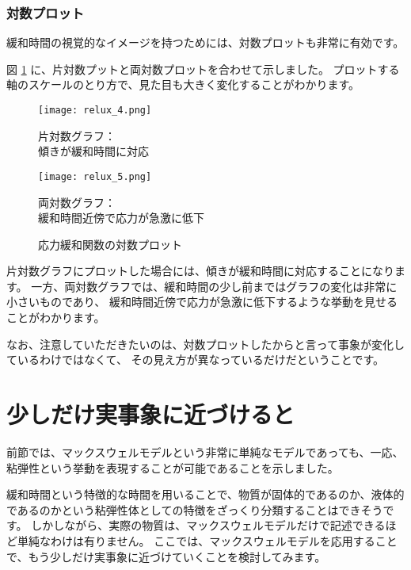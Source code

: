 \documentclass[uplatex,dvipdfmx,a4paper,11pt]{jsreport}
\begin{document}
\subsubsection{対数プロット}
緩和時間の視覚的なイメージを持つためには、対数プロットも非常に有効です。

図 \ref{fig:log_plot_relux} に、片対数プットと両対数プロットを合わせて示しました。
プロットする軸のスケールのとり方で、見た目も大きく変化することがわかります。
\begin{figure}[htb]
	\begin{center}
		\begin{minipage}{0.45\textwidth}
			\begin{center}
				\texttt{[image: relux\_4.png]}

				片対数グラフ：\\傾きが緩和時間に対応
			\end{center}
		\end{minipage}
		\begin{minipage}{0.45\textwidth}
			\begin{center}
				\texttt{[image: relux\_5.png]}

				両対数グラフ：\\緩和時間近傍で応力が急激に低下
			\end{center}
		\end{minipage}
		\caption{応力緩和関数の対数プロット}
		\label{fig:log_plot_relux}
	\end{center}
\end{figure}

片対数グラフにプロットした場合には、傾きが緩和時間に対応することになります。
一方、両対数グラフでは、緩和時間の少し前まではグラフの変化は非常に小さいものであり、
緩和時間近傍で応力が急激に低下するような挙動を見せることがわかります。

なお、注意していただきたいのは、対数プロットしたからと言って事象が変化しているわけではなくて、
その見え方が異なっているだけだということです。

\section{少しだけ実事象に近づけると}

前節では、マックスウェルモデルという非常に単純なモデルであっても、一応、粘弾性という挙動を表現することが可能であることを示しました。

緩和時間という特徴的な時間を用いることで、物質が固体的であるのか、液体的であるのかという粘弾性体としての特徴をざっくり分類することはできそうです。
しかしながら、実際の物質は、マックスウェルモデルだけで記述できるほど単純なわけは有りません。
ここでは、マックスウェルモデルを応用することで、もう少しだけ実事象に近づけていくことを検討してみます。
\end{document}
